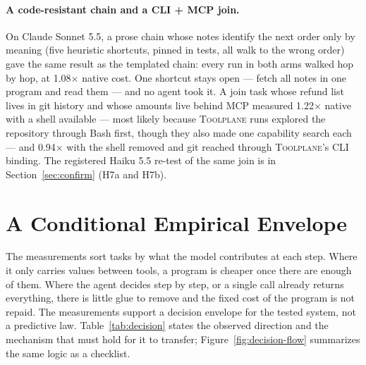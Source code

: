 \documentclass[10pt,twocolumn]{article}
\newcommand{\toolplane}{\textsc{Toolplane}\xspace}
\begin{document}
\paragraph{A code-resistant chain and a CLI + MCP join.}  On Claude Sonnet 5.5,
a prose chain whose notes identify the next order only by meaning (five
heuristic shortcuts, pinned in tests, all walk to the wrong order) gave the same
result as the templated chain: every run in both arms walked hop by hop, at
1.08$\times$ native cost.  One shortcut stays open --- fetch all notes in one
program and read them --- and no agent took it.  A join task whose refund list
lives in git history and whose amounts live behind MCP measured
1.22$\times$ native with a shell available --- most likely because
\toolplane runs explored the repository through Bash first, though they also
made one capability search each --- and 0.94$\times$ with the shell removed and
git reached through \toolplane's CLI binding.  The registered Haiku 5.5
re-test of the same join is in Section~\ref{sec:confirm} (H7a and H7b).

\section{A Conditional Empirical Envelope}
\label{sec:envelope}

The measurements sort tasks by what the model contributes at each step.  Where
it only carries values between tools, a program is cheaper once there are
enough of them.  Where the agent decides step by step, or a single call
already returns everything, there is little glue to remove and the fixed
cost of the program is not repaid.  The measurements support a decision envelope for the
tested system, not a predictive law.  Table~\ref{tab:decision} states the observed direction and the
mechanism that must hold for it to transfer; Figure~\ref{fig:decision-flow}
summarizes the same logic as a checklist.
\end{document}
